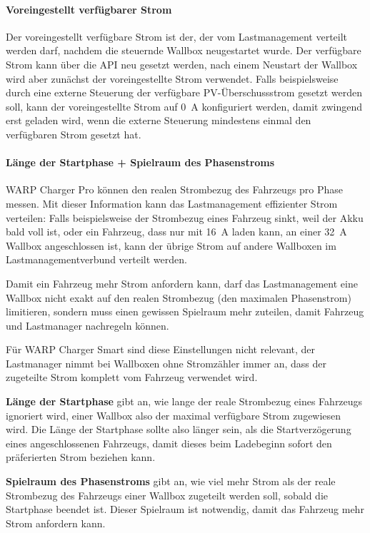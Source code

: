\documentclass[a4paper,10pt]{article}
\begin{document}
\begin{multicols*}{2}
    \paragraph{Voreingestellt verfügbarer Strom}
    Der voreingestellt verfügbare Strom ist der, der vom Lastmanagement verteilt werden darf, nachdem die steuernde Wallbox
    neugestartet wurde. Der verfügbare Strom kann über die API neu gesetzt werden, nach einem Neustart der Wallbox wird aber
    zunächst der voreingestellte Strom verwendet. Falls beispielsweise durch eine externe Steuerung der verfügbare PV-Überschussstrom
    gesetzt werden soll, kann der voreingestellte Strom auf \SI{0}{\ampere} konfiguriert werden, damit zwingend erst geladen wird,
    wenn die externe Steuerung mindestens einmal den verfügbaren Strom gesetzt
	hat.

    \paragraph{Länge der Startphase + Spielraum des Phasenstroms}
    WARP Charger Pro können den realen Strombezug des Fahrzeugs pro Phase messen.
    Mit dieser Information kann das Lastmanagement effizienter Strom verteilen: Falls beispielsweise
    der Strombezug eines Fahrzeug sinkt, weil der Akku bald voll ist, oder ein Fahrzeug, dass nur mit \SI{16}{\ampere}
    laden kann, an einer \SI{32}{\ampere} Wallbox angeschlossen ist, kann der übrige Strom auf andere Wallboxen
    im Lastmanagementverbund verteilt werden.

    Damit ein Fahrzeug mehr Strom anfordern kann, darf das Lastmanagement eine Wallbox nicht exakt
    auf den realen Strombezug (den maximalen Phasenstrom) limitieren, sondern muss einen gewissen Spielraum
    mehr zuteilen, damit Fahrzeug und Lastmanager nachregeln können.

    Für WARP Charger Smart sind diese Einstellungen nicht relevant,
    der Lastmanager nimmt bei Wallboxen ohne Stromzähler immer an, dass der zugeteilte Strom komplett vom Fahrzeug verwendet wird.

    \textbf{Länge der Startphase} gibt an, wie lange der reale Strombezug eines Fahrzeugs ignoriert wird,
    einer Wallbox also der maximal verfügbare Strom zugewiesen wird. Die Länge der Startphase sollte also
    länger sein, als die Startverzögerung eines angeschlossenen Fahrzeugs, damit dieses beim Ladebeginn
    sofort den präferierten Strom beziehen kann.

    \textbf{Spielraum des Phasenstroms} gibt an, wie viel mehr Strom als der reale Strombezug des Fahrzeugs
    einer Wallbox zugeteilt werden soll, sobald die Startphase beendet ist. Dieser Spielraum ist notwendig, damit
    das Fahrzeug mehr Strom anfordern kann.


\end{multicols*}
\end{document}
